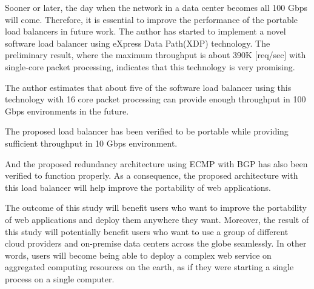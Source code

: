 Sooner or later, the day when the network in a data center becomes all 100 Gbps will come.
  Therefore, it is essential to improve the performance of the portable load balancers in future work.
  The author has started to implement a novel software load balancer using eXpress Data Path(XDP) technology.
  The preliminary result, where the maximum throughput is about 390K [req/sec] with single-core packet processing, indicates that this technology is very promising.


The author estimates that about five of the software load balancer using this technology with 16 core packet processing can provide enough throughput in 100  Gbps environments in the future. 

The proposed load balancer has been verified to be portable while providing  sufficient throughput in 10 Gbps environment.

  And the proposed redundancy architecture using ECMP with BGP has also been verified to function properly.
  As a consequence, the proposed architecture with this load balancer will help improve the portability of web applications.


The outcome of this study will benefit users who want to improve the portability of web applications and deploy them anywhere they want.
Moreover, the result of this study will potentially benefit users who want to use a group of different cloud providers and on-premise data centers across the globe seamlessly.
In other words, users will become being able to deploy a complex web service on aggregated computing resources on the earth, as if they were starting a single process on a single computer.

